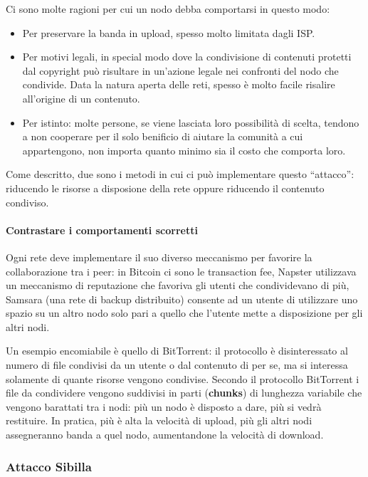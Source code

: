 Ci sono molte ragioni per cui un nodo debba comportarsi in questo modo:

\begin{itemize}
\itemsep1pt\parskip0pt
\item
  Per preservare la banda in upload, spesso molto limitata dagli ISP.
\item
  Per motivi legali, in special modo dove la condivisione di contenuti
  protetti dal copyright può risultare in un'azione legale nei confronti
  del nodo che condivide. Data la natura aperta delle reti, spesso è
  molto facile risalire all'origine di un contenuto.
\item
  Per istinto: molte persone, se viene lasciata loro possibilità di
  scelta, tendono a non cooperare per il solo benificio di aiutare la
  comunità a cui appartengono, non importa quanto minimo sia il costo
  che comporta loro.
\end{itemize}

Come descritto, due sono i metodi in cui ci può implementare questo
``attacco'': riducendo le risorse a disposione della rete oppure
riducendo il contenuto condiviso.

\paragraph{Contrastare i comportamenti
scorretti}\label{contrastare-i-comportamenti-scorretti}

Ogni rete deve implementare il suo diverso meccanismo per favorire la
collaborazione tra i peer: in Bitcoin ci sono le transaction fee,
Napster utilizzava un meccanismo di reputazione che favoriva gli utenti
che condividevano di più, Samsara (una rete di backup distribuito)
consente ad un utente di utilizzare uno spazio su un altro nodo solo
pari a quello che l'utente mette a disposizione per gli altri nodi.

Un esempio encomiabile è quello di BitTorrent: il protocollo è
disinteressato al numero di file condivisi da un utente o dal contenuto
di per se, ma si interessa solamente di quante risorse vengono
condivise. Secondo il protocollo BitTorrent i file da condividere
vengono suddivisi in parti (\textbf{chunks}) di lunghezza variabile che
vengono barattati tra i nodi: più un nodo è disposto a dare, più si
vedrà restituire. In pratica, più è alta la velocità di upload, più gli
altri nodi assegneranno banda a quel nodo, aumentandone la velocità di
download.

\subsubsection{Attacco Sibilla}\label{attacco-sibilla}

